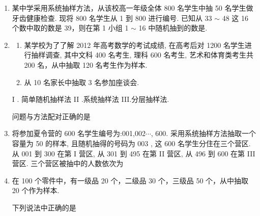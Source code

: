 \begin{enumerate}
    其中 $a : b : c = 2 : 3 : 5$ ，全校参与登山的人数占总人数的 $\dfrac{2}{5}$ . 为了了解学生对本次活动的满意程度，从中抽取一个 200 人的样本进行调查，则从高二年级参与跑步的学生中应抽取.

    \item 某中学采用系统抽样方法，从该校高一年级全体 800 名学生中抽 50 名学生做牙齿健康检查. 现将 800 名学生从 1 到 800 进行编号. 已知从 33 $\sim$  48 这 16 个数中取的数是 39，则在第 1 小组 1 $\sim$  16 中随机抽到的数是.

    \item \begin{enumerate}
        \item 某学校为了了解 2012 年高考数学的考试成绩, 在高考后对 1200 名学生进行抽样调查, 其中文科 400 名考生, 理科 600 名考生, 艺术和体育类考生共 200 名，从中抽取 120 名考生作为样本.
        \item 从 10 名家长中抽取 3 名参加座谈会. 
    \end{enumerate}
    I . 简单随机抽样法 II .系统抽样法 III.分层抽样法.
    
    问题与方法配对正确的是
    
    \item 将参加夏令营的 600 名学生编号为:001,002$\cdots$, 600. 采用系统抽样方法抽取一个容量为 50 的样本, 且随机抽得的号码为 003 , 这 600 名学生分住在三个营区. 从 001 到 300 在第 I 营区, 从 301 到 495 在第 II 营区, 从 496 到 600 在第 III 营区. 三个营区被抽中的人数依次为
    
    \item 在 100 个零件中，有一级品 20 个，二级品 30 个，三级品 50 个，从中抽取 20 个作为样本.
    下列说法中正确的是
    

\end{enumerate}
